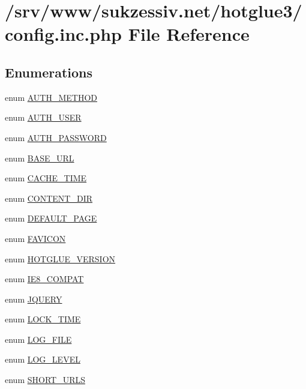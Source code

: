 \hypertarget{config_8inc_8php}{
\section{/srv/www/sukzessiv.net/hotglue3/config.inc.php File Reference}
\label{config_8inc_8php}
}
\subsection*{Enumerations}
\begin{CompactItemize}
\item 
enum \hyperlink{config_8inc_8php_2ee7e30fa45253c5e303994703d3293f}{AUTH\_\-METHOD} 
\item 
enum \hyperlink{config_8inc_8php_7d3a74ff015a9f789a5a2e554a9fa956}{AUTH\_\-USER} 
\item 
enum \hyperlink{config_8inc_8php_df2112da607b39714ba9cca31b42a93a}{AUTH\_\-PASSWORD} 
\item 
enum \hyperlink{config_8inc_8php_16548ab75ed30cbddce178d56d26dbb8}{BASE\_\-URL} 
\item 
enum \hyperlink{config_8inc_8php_fc454c0433a87811735836800fe3350b}{CACHE\_\-TIME} 
\item 
enum \hyperlink{config_8inc_8php_9949c9013641bf07cd112607d200d6ff}{CONTENT\_\-DIR} 
\item 
enum \hyperlink{config_8inc_8php_4208e17d37801abf0982b2d1e625a8f2}{DEFAULT\_\-PAGE} 
\item 
enum \hyperlink{config_8inc_8php_fd55d95ee6651060397404533516882a}{FAVICON} 
\item 
enum \hyperlink{config_8inc_8php_7c35565a4692ae46fd1c04340f4f1ca9}{HOTGLUE\_\-VERSION} 
\item 
enum \hyperlink{config_8inc_8php_1d76a949b348522c90864da5df468d51}{IE8\_\-COMPAT} 
\item 
enum \hyperlink{config_8inc_8php_5c2fff7e41a0380fb7872627e3a14a29}{JQUERY} 
\item 
enum \hyperlink{config_8inc_8php_924ae40271cc363050158e36b3823407}{LOCK\_\-TIME} 
\item 
enum \hyperlink{config_8inc_8php_6de83433b64b24349644a4c2d839dcb7}{LOG\_\-FILE} 
\item 
enum \hyperlink{config_8inc_8php_a5a9053636a30269210c54e734e0d583}{LOG\_\-LEVEL} 
\item 
enum \hyperlink{config_8inc_8php_377ac3321785e25215435e8d9802bc34}{SHORT\_\-URLS} 
\item 

\end{CompactItemize}
